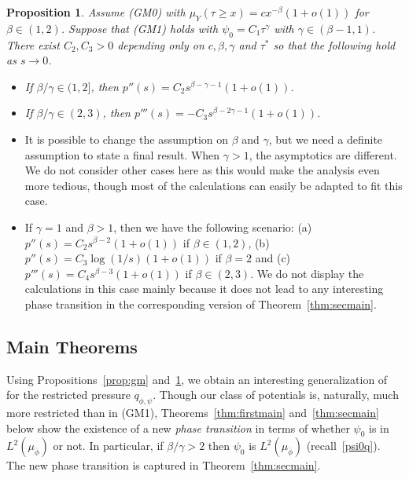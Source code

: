 \documentclass[12pt]{article}
\numberwithin{equation}{section}
\newtheorem{prop}[thm]{Proposition}
\begin{document}
\begin{prop}\label{prop:gmsec} Assume (GM0) with $\mu_Y(\tau\ge x)=c x^{-\beta}(1+o(1))$ for $\beta\in (1,2)$.
Suppose that (GM1) holds with $\psi_0=C_1 \tau^\gamma$ with $\gamma\in (\beta-1,1)$. 
There exist $C_2, C_3>0$ depending only on $c,\beta,\gamma$ and $\tau^*$ so that the following hold as $s\to 0$.
\begin{itemize}
\item[(i)] If $\beta/\gamma\in (1,2]$, then $p''(s)=C_2 s^{\beta-\gamma-1}(1+o(1))$.
\item[(ii)] If $\beta/\gamma\in (2, 3)$, then $p'''(s)=-C_3 s^{\beta-2\gamma-1}(1+o(1))$.
\end{itemize}
\end{prop}
\begin{rmk}
\begin{itemize}
\item[(i)] It is possible to change the assumption on $\beta$ and $\gamma$, but we need a definite assumption to state a final result.
When $\gamma>1$, the asymptotics are different. We do not consider other cases here as this would make the analysis even more tedious,
though most of the calculations can easily be adapted to fit this case.


\item[(ii)]If $\gamma=1$ and $\beta>1$, then we have the following scenario: 
(a) $p''(s)=C_2 s^{\beta-2}(1+o(1))$ if $\beta\in (1,2)$, 
(b)  $p''(s)=C_3 \log(1/s)(1+o(1))$ if $\beta=2$ and
(c) $p'''(s)=C_4 s^{\beta-3}(1+o(1))$
if $\beta\in (2,3)$. We do not display the calculations in this case mainly because it does not lead to any interesting phase transition
in the corresponding version of Theorem~\ref{thm:secmain}.
\end{itemize}
 \end{rmk}

\subsection{Main Theorems}

Using Propositions~\ref{prop:gm} and~\ref{prop:gmsec}, we obtain an interesting generalization
of~\cite{RuhSar22}
for the restricted pressure $q_{\phi, \psi}$. Though our class of potentials is, naturally, much more restricted than in (GM1),
Theorems~\ref{thm:firstmain} and~\ref{thm:secmain}  below show the existence of a new \emph{phase transition}
in terms of whether $\psi_0$ is in $L^{2}(\mu_{\overline{\phi}})$ or not. In particular, 
if $\beta/\gamma>2$ then  $\psi_0$ is $L^2(\mu_{\overline{\phi}})$ (recall~\eqref{psi0q}). The new phase transition is  captured in Theorem~\ref{thm:secmain}.
\end{document}
